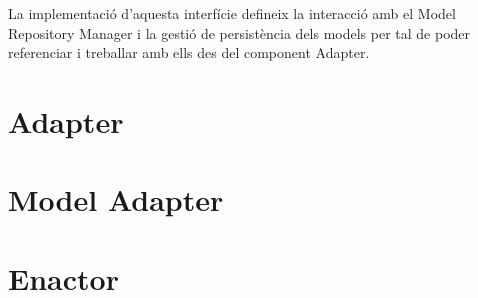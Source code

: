 La implementació d'aquesta interfície defineix la interacció amb el Model Repository Manager i la gestió de persistència dels models per tal de poder referenciar i treballar amb ells des del component Adapter.

\section{Adapter}

\section{Model Adapter}

\section{Enactor}
